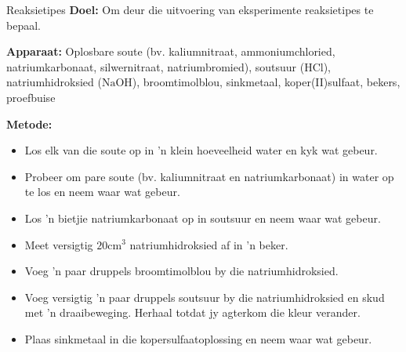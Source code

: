 \clearpage
\begin{g_experiment}{Reaksietipes}
\nopagebreak
\label{m38719*eip-190}\noindent{}\textbf{Doel: }\newline
Om deur die uitvoering van eksperimente reaksietipes te bepaal.
\par 
\label{m38719*eip-1901}\noindent{}\textbf{Apparaat: }\newline
Oplosbare soute (bv. kaliumnitraat, ammoniumchloried, natriumkarbonaat, silwernitraat, natriumbromied), soutsuur ($\text{HCl}$), natriumhidroksied ($\text{NaOH}$), broomtimolblou, sinkmetaal, koper(II)sulfaat, bekers, proefbuise
\par 
\label{m38719*eip-1902}\noindent{}\textbf{Metode: }\label{m38719*id6231}\\
\begin{minipage}{0.9\textwidth}\vspace*{1em}
\begin{itemize}[noitemsep]
\item Los elk van die soute op in 'n klein hoeveelheid water en kyk wat gebeur.
\item Probeer om pare soute (bv. kaliumnitraat en natriumkarbonaat) in water op te los en neem waar wat gebeur.
\item Los  'n bietjie natriumkarbonaat op in soutsuur en neem waar wat gebeur.
\item Meet versigtig $20{\text{cm}}^{3}$ natriumhidroksied af in 'n beker. 
\item Voeg 'n paar druppels broomtimolblou by die natriumhidroksied.
\item Voeg versigtig 'n paar druppels soutsuur by die natriumhidroksied en skud met  'n draaibeweging. Herhaal totdat jy agterkom die kleur verander.
\item Plaas sinkmetaal in die kopersulfaatoplossing en neem waar wat gebeur.
\end{itemize}\vspace*{1em}


\end{minipage}
\end{g_experiment}
